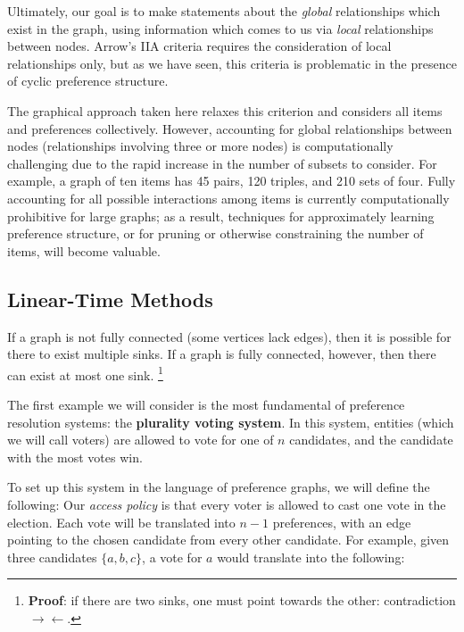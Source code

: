 
Ultimately, our goal is to make statements about the \textit{global} relationships which exist in the graph, using information which comes to us via \textit{local} relationships between nodes.
Arrow's IIA criteria requires the consideration of local relationships only, but as we have seen, this criteria is problematic in the presence of cyclic preference structure.

The graphical approach taken here relaxes this criterion and considers all items and preferences collectively.
However, accounting for global relationships between nodes (relationships involving three or more nodes) is computationally challenging due to the rapid increase in the number of subsets to consider.
For example, a graph of ten items has 45 pairs, 120 triples, and 210 sets of four.
Fully accounting for all possible interactions among items is currently computationally prohibitive for large graphs; as a result, techniques for approximately learning preference structure, or for pruning or otherwise constraining the number of items, will become valuable.

\subsection{Linear-Time Methods}

If a graph is not fully connected (some vertices lack edges), then it is possible for there to exist multiple sinks.
If a graph is fully connected, however, then there can exist at most one sink.
\footnote{\textbf{Proof}: if there are two sinks, one must point towards the other: contradiction $\rightarrow\leftarrow$.}

The first example we will consider is the most fundamental of preference resolution systems: the \textbf{plurality voting system}.
In this system, entities (which we will call voters) are allowed to vote for one of $n$ candidates, and the candidate with the most votes win.

To set up this system in the language of preference graphs, we will define the following:
Our \textit{access policy} is that every voter is allowed to cast one vote in the election.
Each vote will be translated into $n-1$ preferences, with an edge pointing to the chosen candidate from every other candidate.
For example, given three candidates $\{a, b, c\}$, a vote for $a$ would translate into the following:

\begin{center}
	

	
\end{center}

